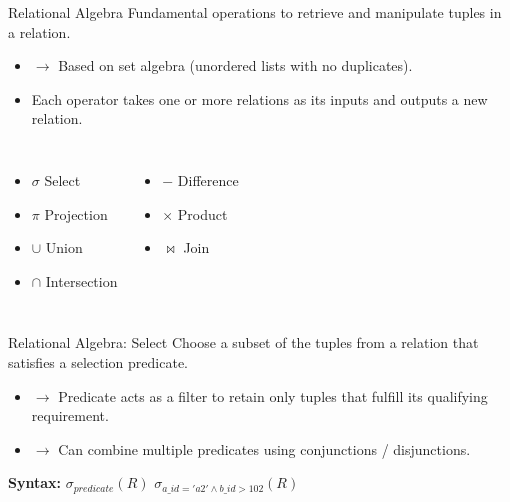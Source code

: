 \documentclass[aspectratio=169, 10pt]{beamer}
\begin{document}
\begin{frame}{Relational Algebra}
    Fundamental operations to retrieve and manipulate tuples in a relation.
    \begin{itemize}
        \item $\rightarrow$ Based on set algebra (unordered lists with no duplicates).
        \item Each operator takes one or more relations as its inputs and outputs a new relation.        \end{itemize}
    \vspace{1em}
    \begin{columns}
        \begin{itemize}
            \item $\sigma$ Select
            \item $\pi$ Projection
            \item $\cup$ Union
            \item $\cap$ Intersection
        \end{itemize}
        \begin{itemize}
            \item $-$ Difference
            \item $\times$ Product
            \item $\bowtie$ Join
        \end{itemize}
    \end{columns}
\end{frame}

\begin{frame}{Relational Algebra: Select}
    Choose a subset of the tuples from a relation that satisfies a selection predicate.
    \begin{itemize}
        \item $\rightarrow$ Predicate acts as a filter to retain only tuples that fulfill its qualifying requirement.
        \item $\rightarrow$ Can combine multiple predicates using conjunctions / disjunctions.
    \end{itemize}
    \vspace{1em}
    \textbf{Syntax:} $\sigma_{predicate}(R)$
    \vspace{1em}
    $\sigma_{a\_id='a2' \land b\_id>102}(R)$
\end{frame}
\end{document}
